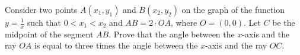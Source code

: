 Consider two points $A(x_1, y_1)$ and $B(x_2, y_2)$ on the graph of the function $y = \frac{1}{x}$ such that $0 < x_1 < x_2$ and $AB = 2 \cdot OA$,  where $O = (0, 0)$. Let $C$ be the midpoint of the segment $AB$. Prove that the angle between the $x$-axis and the ray $OA$ is equal to three times the angle between the $x$-axis and the ray $OC$.